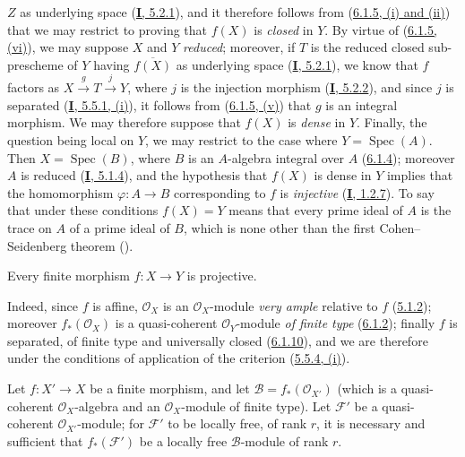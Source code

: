 $Z$ as underlying space (\hyperref[I.5.2.1]{\textbf{I}, 5.2.1}), and it therefore
follows from (\hyperref[II.6.1.5]{6.1.5, (i) and (ii)}) that we may
restrict to proving that $f(X)$ is \emph{closed} in $Y$. By virtue of
(\hyperref[II.6.1.5]{6.1.5, (vi)}), we may suppose $X$ and $Y$ \emph{reduced};
moreover, if $T$ is the reduced closed sub-prescheme of $Y$ having
$\overline{f(X)}$ as underlying space (\hyperref[I.5.2.1]{\textbf{I}, 5.2.1}), we
know that $f$ factors as $X\xrightarrow{g}T\xrightarrow{j}Y$, where $j$ is
the injection morphism (\hyperref[I.5.2.2]{\textbf{I}, 5.2.2}), and since $j$ is
separated (\hyperref[I.5.5.1]{\textbf{I}, 5.5.1, (i)}), it follows from
(\hyperref[II.6.1.5]{6.1.5, (v)}) that $g$ is an integral morphism. We may
therefore suppose that $f(X)$ is \emph{dense} in $Y$. Finally, the question being
local on $Y$, we may restrict to the case where $Y=\operatorname{Spec}(A)$.
Then $X=\operatorname{Spec}(B)$, where $B$ is an $A$-algebra integral over
$A$ (\hyperref[II.6.1.4]{6.1.4}); moreover $A$ is reduced
(\hyperref[I.5.1.4]{\textbf{I}, 5.1.4}), and the hypothesis that $f(X)$ is dense in
$Y$ implies that the homomorphism $\varphi:A\to B$ corresponding to $f$ is
\emph{injective} (\hyperref[I.1.2.7]{\textbf{I}, 1.2.7}). To say that under these
conditions $f(X)=Y$ means that every prime ideal of $A$ is the trace on $A$
of a prime ideal of $B$, which is none other than the first
Cohen--Seidenberg theorem (\cite[vol.~I, p.~257, Theorem~3]{I-13}).

\begin{corollary}[6.1.11]
\label{II.6.1.11}
Every finite morphism $f:X\to Y$ is projective.
\end{corollary}

Indeed, since $f$ is affine, $\mathcal{O}_X$ is an $\mathcal{O}_X$-module
\emph{very ample} relative to $f$ (\hyperref[II.5.1.2]{5.1.2}); moreover
$f_*(\mathcal{O}_X)$ is a quasi-coherent $\mathcal{O}_Y$-module \emph{of finite
type} (\hyperref[II.6.1.2]{6.1.2}); finally $f$ is separated, of finite
type and universally closed (\hyperref[II.6.1.10]{6.1.10}), and we are
therefore under the conditions of application of the criterion
(\hyperref[II.5.5.4]{5.5.4, (i)}).

\begin{proposition}[6.1.12]
\label{II.6.1.12}
Let $f:X'\to X$ be a finite morphism, and let
$\mathcal{B}=f_*(\mathcal{O}_{X'})$ (which is a quasi-coherent
$\mathcal{O}_X$-algebra and an $\mathcal{O}_X$-module of finite type). Let
$\mathcal{F}'$ be a quasi-coherent $\mathcal{O}_{X'}$-module; for
$\mathcal{F}'$ to be locally free, of rank $r$, it is necessary and
sufficient that $f_*(\mathcal{F}')$ be a locally free $\mathcal{B}$-module of
rank $r$.
\end{proposition}

